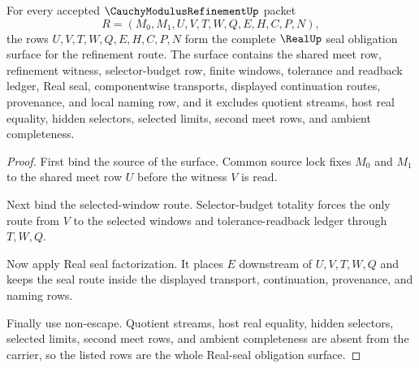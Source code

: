 \begin{theorem}
\label{thm:cauchy-modulus-refinement-real-seal-obligation-surface}
For every accepted $\CauchyModulusRefinementUp$ packet
$$
R=(M_0,M_1,U,V,T,W,Q,E,H,C,P,N),
$$
the rows $U,V,T,W,Q,E,H,C,P,N$ form the complete $\RealUp$ seal obligation surface for the refinement route. The surface contains the shared meet row, refinement witness, selector-budget row, finite windows, tolerance and readback ledger, Real seal, componentwise transports, displayed continuation routes, provenance, and local naming row, and it excludes quotient streams, host real equality, hidden selectors, selected limits, second meet rows, and ambient completeness.
\end{theorem}
\begin{proof}
First bind the source of the surface. Common source lock fixes $M_0$ and $M_1$ to the shared meet row $U$ before the witness $V$ is read.

Next bind the selected-window route. Selector-budget totality forces the only route from $V$ to the selected windows and tolerance-readback ledger through $T,W,Q$.

Now apply Real seal factorization. It places $E$ downstream of $U,V,T,W,Q$ and keeps the seal route inside the displayed transport, continuation, provenance, and naming rows.

Finally use non-escape. Quotient streams, host real equality, hidden selectors, selected limits, second meet rows, and ambient completeness are absent from the carrier, so the listed rows are the whole Real-seal obligation surface.
\end{proof}

